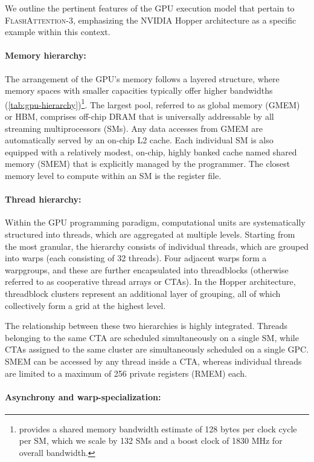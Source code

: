 We outline the pertinent features of the GPU execution model that pertain to \textsc{FlashAttention-3}, emphasizing the NVIDIA Hopper architecture as a specific example within this context.

\paragraph{Memory hierarchy:} The arrangement of the GPU's memory follows a layered structure, where memory spaces with smaller capacities typically offer higher bandwidths (\cref{tab:gpu-hierarchy})\footnote{\citet{luo2024benchmarking} provides a shared memory bandwidth estimate of 128 bytes per clock cycle per SM, which we scale by 132 SMs and a boost clock of 1830 MHz for overall bandwidth.}. The largest pool, referred to as global memory (GMEM) or HBM, comprises off-chip DRAM that is universally addressable by all streaming multiprocessors (SMs). Any data accesses from GMEM are automatically served by an on-chip L2 cache. Each individual SM is also equipped with a relatively modest, on-chip, highly banked cache named shared memory (SMEM) that is explicitly managed by the programmer. The closest memory level to compute within an SM is the register file.

\paragraph{Thread hierarchy:} Within the GPU programming paradigm, computational units are systematically structured into threads, which are aggregated at multiple levels. Starting from the most granular, the hierarchy consists of individual threads, which are grouped into warps (each consisting of 32 threads). Four adjacent warps form a warpgroups, and these are further encapsulated into threadblocks (otherwise referred to as cooperative thread arrays or CTAs). In the Hopper architecture, threadblock clusters represent an additional layer of grouping, all of which collectively form a grid at the highest level.

The relationship between these two hierarchies is highly integrated. Threads belonging to the same CTA are scheduled simultaneously on a single SM, while CTAs assigned to the same cluster are simultaneously scheduled on a single GPC. SMEM can be accessed by any thread inside a CTA, whereas individual threads are limited to a maximum of 256 private registers (RMEM) each.

\paragraph{Asynchrony and warp-specialization:}

